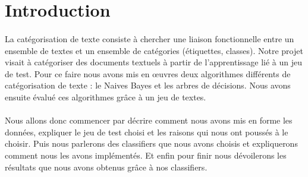 \newpage
\section*{Introduction}
\paragraph{}
La catégorisation de texte consiste à chercher une liaison fonctionnelle entre un ensemble de textes et un ensemble de catégories (étiquettes, classes). Notre projet visait à catégoriser des documents textuels à partir de l'apprentissage lié à un jeu de test. Pour ce faire nous avons mis en œuvres deux algorithmes différents de catégorisation de texte : le Naives Bayes et les arbres de décisions.  Nous avons ensuite évalué ces algorithmes grâce à un jeu de textes.

\paragraph{}
Nous allons donc commencer par décrire comment nous avons mis en forme les données, expliquer le jeu de test choisi et les raisons qui nous ont poussés à le choisir. Puis nous parlerons des classifiers que nous avons choisis et expliquerons comment nous les avons implémentés. Et enfin pour finir nous dévoilerons les résultats que nous avons obtenus grâce à nos classifiers.


\newpage

